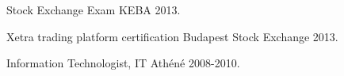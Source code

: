 \begin{cventries}
  \cventry
    {Stock Exchange Exam} %
    {KEBA} %
    {} %
    {2013.} %
    {
    }
    \vspace{-2.0mm}

    
  \cventry
    {Xetra trading platform certification} %
    {Budapest Stock Exchange} %
    {} %
    {2013.} %
    {
    }
    \vspace{-2.0mm}

  \cventry
    {Information Technologist, IT} %
    {Athéné} %
    {} %
    {2008-2010.} %
    {
    }

\end{cventries}
